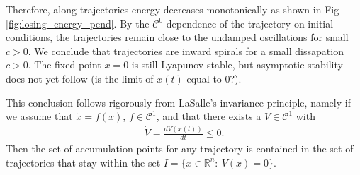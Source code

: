 \begin{ex}
Therefore, along trajectories energy decreases monotonically as shown in Fig \ref{fig:losing_energy_pend}. By the $\mathcal{C}^0$ dependence of the trajectory on initial conditions, the trajectories remain close to the undamped oscillations for small $c>0$. We conclude that trajectories are inward spirals for a small dissapation $c>0$. The fixed point $ {x}=0$ is still Lyapunov stable, but asymptotic stability does not yet follow (is the limit of $ {x}(t)$ equal to 0?).
\begin{remark}
	This conclusion follows rigorously from LaSalle's invariance principle, namely if we assume that $\dot{ {x}}=f( {x})$, $f \in \mathcal{C}^1$, and that there exists a $V\in \mathcal{C}^1$ with 
	\begin{align}
		\dot{V} = \frac{dV( {x}(t))}{dt} \leq 0.	
	\end{align}
	Then the set of accumulation points for any trajectory is contained in the set of trajectories that stay within the set $I=\{ {x} \in \mathbb{R}^{n}:\ \dot{V}( {x}) = 0\}$.
\end{remark}
\end{ex}

